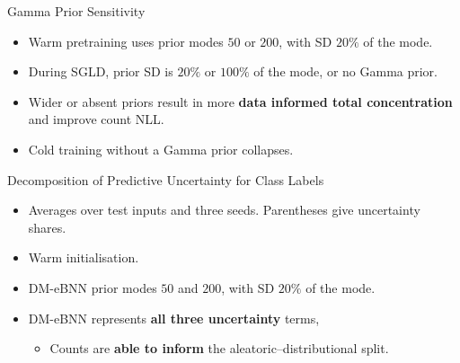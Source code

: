 \begin{frame}{Gamma Prior Sensitivity}
\label{frm:count-prior-sensitivity}
\begin{itemize}
\setlength{\itemsep}{2mm}
\item  Warm pretraining uses prior modes $50$ or $200$, with SD $20\%$ of the mode.
\item During SGLD, prior SD is $20\%$ or $100\%$ of the mode, or no Gamma prior.
\item Wider or absent priors result in more \textbf{data informed total concentration} and improve count NLL. 
\item Cold training without a Gamma prior collapses.
\end{itemize}
\end{frame}

\begin{frame}{Decomposition of Predictive Uncertainty for Class Labels}
\label{frm:count-decomposition}
\begin{itemize}
\setlength{\itemsep}{2mm}
\item Averages over test inputs and three seeds. Parentheses give uncertainty shares.
\item Warm initialisation. 
\item DM-eBNN prior modes $50$ and $200$, with SD $20\%$ of the mode.
\item DM-eBNN represents \textbf{all three uncertainty} terms, 
\begin{itemize}
\item Counts are \textbf{able to inform} the aleatoric--distributional split.
\end{itemize}
\end{itemize}
\end{frame}

